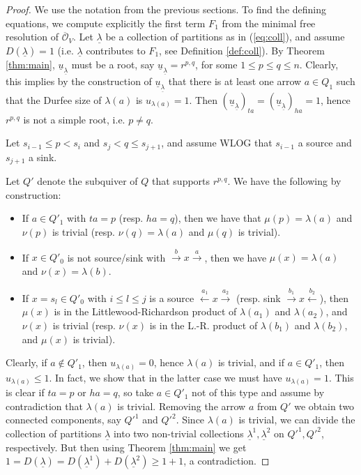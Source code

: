 \documentclass[twoside]{article}
\newcommand{\orb}{\mathcal{O}}
\newcommand{\und}{\underline}
\theoremstyle{definition}
\begin{document}
\begin{proof}
We use the notation from the previous sections. To find the defining equations, we compute explicitly the first term $F_1$ from the minimal free resolution of $\overline{\orb}_V$. Let $\underline{\lambda}$ be a collection of partitions as in (\ref{eq:coll}), and assume $D(\underline{\lambda})=1$ (i.e. $\underline{\lambda}$ contributes to $F_1$, see Definition \ref{def:coll}). By Theorem \ref{thm:main}, $\und{u}_{\und{\lambda}}$ must be a root, say $\und{u}_{\und{\lambda}}=r^{p,q}$, for some $1\leq p \leq q \leq n$. Clearly, this implies by the construction of $\und{u}_{\und{\lambda}}$ that there is at least one arrow $a\in Q_1$ such that the Durfee size of $\lambda(a)$ is $u_{\lambda(a)}=1$. Then $(\und{u}_{\und{\lambda}})_{ta}=(\und{u}_{\und{\lambda}})_{ha}=1$, hence $r^{p,q}$ is not a simple root, i.e. $p\neq q$. 

Let $s_{i-1}\leq p <s_i$ and $s_j < q \leq s_{j+1}$, and assume WLOG that $s_{i-1}$ a source and $s_{j+1}$ a sink. 

Let $Q'$ denote the subquiver of $Q$ that supports $r^{p,q}$. We have the following by construction:
\begin{itemize}
\item If $a\in Q'_1$ with $ta=p$ (resp. $ha=q$), then we have that $\mu(p)=\lambda(a)$ and $\nu(p)$ is trivial (resp. $\nu(q)=\lambda(a)$ and $\mu(q)$ is trivial).
\item If $x\in Q'_0$ is not source/sink with $\xrightarrow{b} x \xrightarrow{a}$, then we have $\mu(x)=\lambda(a)$ and $\nu(x)=\lambda(b)$.
\item If $x=s_l\in Q'_0$ with $i\leq l\leq j$ is a source $\xleftarrow{a_1} x \xrightarrow{a_2}$ (resp. sink $\xrightarrow{b_1} x \xleftarrow{b_2}$), then $\mu(x)$ is in the Littlewood-Richardson product of $\lambda(a_1)$ and $\lambda(a_2)$, and $\nu(x)$ is trivial (resp. $\nu(x)$ is in the L.-R. product of $\lambda(b_1)$ and $\lambda(b_2)$, and $\mu(x)$ is trivial).
\end{itemize}
Clearly, if $a\notin Q'_1$, then $u_{\lambda(a)}=0$, hence $\lambda(a)$ is trivial, and if $a\in Q'_1$, then $u_{\lambda(a)}\leq 1$. In fact, we show that in the latter case we must have $u_{\lambda(a)}=1$. This is clear if $ta=p$ or $ha=q$, so take $a\in Q'_1$ not of this type and assume by contradiction that $\lambda(a)$ is trivial. Removing the arrow $a$ from $Q'$ we obtain two connected components, say $Q'^1$ and $Q'^2$. Since $\lambda(a)$ is trivial, we can divide the collection of partitions $\und{\lambda}$ into two non-trivial collections $\und{\lambda}^1,\und{\lambda}^2$ on $Q'^1,Q'^2$, respectively. But then using Theorem \ref{thm:main} we get $1=D(\und{\lambda})= D(\und{\lambda}^1)+D(\und{\lambda}^2)\geq 1+1$, a contradiction. 


\end{proof}
\end{document}

